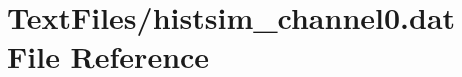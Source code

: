 \hypertarget{TextFiles_2histsim__channel0_8dat}{}\section{Text\+Files/histsim\+\_\+channel0.dat File Reference}
\label{TextFiles_2histsim__channel0_8dat}
